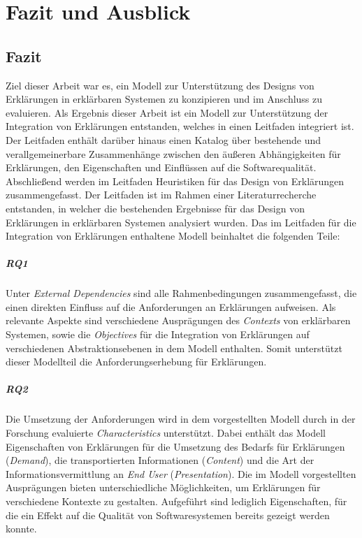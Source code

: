 \chapter{Fazit und Ausblick}

\section{Fazit}

Ziel dieser Arbeit war es, ein Modell zur Unterstützung des Designs von Erklärungen in erklärbaren Systemen zu konzipieren und im Anschluss zu evaluieren. Als Ergebnis dieser Arbeit ist ein Modell zur Unterstützung der Integration von Erklärungen entstanden, welches in einen Leitfaden integriert ist. Der Leitfaden enthält darüber hinaus einen Katalog über bestehende und verallgemeinerbare Zusammenhänge zwischen den äußeren Abhängigkeiten für Erklärungen, den Eigenschaften und Einflüssen auf die Softwarequalität. Abschließend werden im Leitfaden Heuristiken für das Design von Erklärungen zusammengefasst. Der Leitfaden ist im Rahmen einer Literaturrecherche entstanden, in welcher die bestehenden Ergebnisse für das Design von Erklärungen in erklärbaren Systemen analysiert wurden. Das im Leitfaden für die Integration von Erklärungen enthaltene Modell beinhaltet die folgenden Teile:

\paragraph{RQ1} Unter \textit{External Dependencies} sind alle Rahmenbedingungen zusammengefasst, die einen direkten Einfluss auf die Anforderungen an Erklärungen aufweisen. Als relevante Aspekte sind verschiedene Ausprägungen des \textit{Contexts} von erklärbaren Systemen, sowie die \textit{Objectives} für die Integration von Erklärungen auf verschiedenen Abstraktionsebenen in dem Modell enthalten. Somit unterstützt dieser Modellteil die Anforderungserhebung für Erklärungen.

\paragraph{RQ2} Die Umsetzung der Anforderungen wird in dem vorgestellten Modell durch in der Forschung evaluierte \textit{Characteristics} unterstützt. Dabei enthält das Modell Eigenschaften von Erklärungen für die Umsetzung des Bedarfs für Erklärungen (\textit{Demand}), die transportierten Informationen (\textit{Content}) und die Art der Informationsvermittlung an \textit{End User} (\textit{Presentation}). Die im Modell vorgestellten Ausprägungen bieten unterschiedliche Möglichkeiten, um Erklärungen für verschiedene Kontexte zu gestalten. Aufgeführt sind lediglich Eigenschaften, für die ein Effekt auf die Qualität von Softwaresystemen bereits gezeigt werden konnte.

